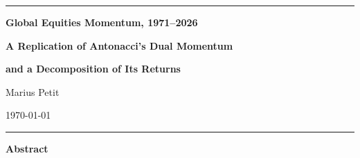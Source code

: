 \documentclass[11pt,a4paper]{article}
\begin{document}
\thispagestyle{empty}

\noindent\rule{\textwidth}{0.9pt}

\vspace{1.6em}
\begin{center}
  {\LARGE\bfseries Global Equities Momentum, 1971--2026\par}
  \vspace{0.45em}
  {\Large\bfseries A Replication of Antonacci's Dual Momentum\par}
  \vspace{0.2em}
  {\Large\bfseries and a Decomposition of Its Returns\par}

  \vspace{2.0em}
  {\large Marius Petit\footnotemark[1]\par}

  \vspace{1.6em}
  {\normalsize \today\par}
\end{center}
\vspace{1.4em}

\noindent\rule{\textwidth}{0.9pt}

\vspace{1.8em}
\begin{center}\textbf{Abstract}\end{center}
\vspace{0.4em}
\end{document}
